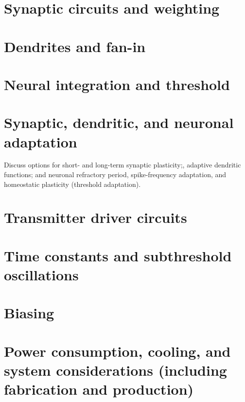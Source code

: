 \documentclass[twocolumn]{article}
\begin{document}
\section{\label{sec:synapses}Synaptic circuits and weighting}

\section{\label{sec:dendrites}Dendrites and fan-in}

\section{\label{sec:neurons}Neural integration and threshold}

\section{\label{sec:adaptation}Synaptic, dendritic, and neuronal adaptation}
Discuss options for short- and long-term synaptic plasticity;, adaptive dendritic functions; and neuronal refractory period, spike-frequency adaptation, and homeostatic plasticity (threshold adaptation).

\section{\label{sec:transmitters}Transmitter driver circuits}

\section{\label{sec:time_constants}Time constants and subthreshold oscillations}

\section{\label{sec:biasing}Biasing}

\section{\label{sec:systems}Power consumption, cooling, and system considerations (including fabrication and production)}

\end{document}
